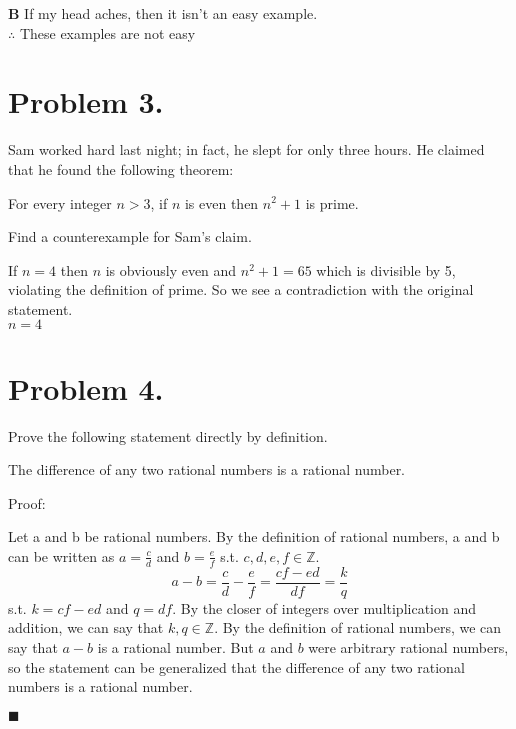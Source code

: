 \documentclass[11pt]{article}
\begin{document}
{\bf B} If my head aches, then it isn't an easy example.\\

$\therefore$ These examples are not easy

\newpage

\section*{Problem 3.}

Sam worked hard last night; in fact, he slept for only three hours. He claimed that he found the following theorem:

For every integer $n>3$, if $n$ is even then $n^2+1$ is prime.
\newline

\noindent
Find a counterexample for Sam's claim.
\newline

If $n =4$ then $n$ is obviously even and $n^2 + 1 = 65$ which is divisible by 5, violating the definition of prime. So we see a contradiction with the original statement. \\

$\boxed{n  = 4}$


\newpage

\noindent
\section*{Problem 4.}

Prove the following statement directly by definition.
\newline

The difference of any two rational numbers is a rational number.
\newline

Proof:

Let a and b be rational numbers. By the definition of rational numbers, a and b can be written as $a = \frac{c}{d}$ and $b = \frac{e}{f}$ s.t. $c,d,e,f \in \mathbb{Z}$. 
\[a - b = \frac{c}{d} - \frac{e}{f} = \frac{cf -ed}{df} = \frac{k}{q}\]
s.t. $k = cf -ed$ and $q = df$. By the closer of integers over multiplication and addition, we can say that $k,q \in \mathbb{Z}$. By the definition of rational numbers, we can say that $a-b$ is a rational number. But $a$ and $b$ were arbitrary rational numbers, so the statement can be generalized that the difference of any two rational numbers is a rational number.
\begin{flushright}$\blacksquare$\end{flushright}
\end{document}
